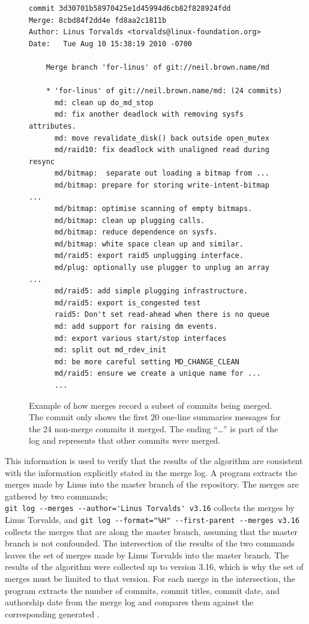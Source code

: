 \begin{figure}[htpb]
  \centering
\begin{textbox}
  \begin{verbatim}commit 3d30701b58970425e1d45994d6cb82f828924fdd
Merge: 8cbd84f2dd4e fd8aa2c1811b
Author: Linus Torvalds <torvalds@linux-foundation.org>
Date:   Tue Aug 10 15:38:19 2010 -0700

    Merge branch 'for-linus' of git://neil.brown.name/md

    * 'for-linus' of git://neil.brown.name/md: (24 commits)
      md: clean up do_md_stop
      md: fix another deadlock with removing sysfs attributes.
      md: move revalidate_disk() back outside open_mutex
      md/raid10: fix deadlock with unaligned read during resync
      md/bitmap:  separate out loading a bitmap from ...
      md/bitmap: prepare for storing write-intent-bitmap ...
      md/bitmap: optimise scanning of empty bitmaps.
      md/bitmap: clean up plugging calls.
      md/bitmap: reduce dependence on sysfs.
      md/bitmap: white space clean up and similar.
      md/raid5: export raid5 unplugging interface.
      md/plug: optionally use plugger to unplug an array ...
      md/raid5: add simple plugging infrastructure.
      md/raid5: export is_congested test
      raid5: Don't set read-ahead when there is no queue
      md: add support for raising dm events.
      md: export various start/stop interfaces
      md: split out md_rdev_init
      md: be more careful setting MD_CHANGE_CLEAN
      md/raid5: ensure we create a unique name for ...
      ...
  \end{verbatim}
\end{textbox}
  \caption{Example of how merges record a subset of commits being merged. The
                commit only shows the first 20 one-line summaries messages for the 24
                non-merge commits it merged. The ending ``\ldots'' is part of the log
                and represents that other commits were merged.}
  \label{fig:sampleMerge}
\end{figure}

This information is used to verify that the results of the \mt{}
algorithm are consistent with the information explicitly stated in the
merge log.
A program extracts the merges made by Linus into the master branch of
the repository.
The merges are gathered by two commands;\\
\verb|git log --merges --author='Linus Torvalds' v3.16| collects the
merges by Linus Torvalds, and
\verb|git log --format="%H" --first-parent --merges v3.16| collects the
merges that are along the master branch, assuming that the master branch
is not confounded.
The intersection of the results of the two commands leaves the set of
merges made by Linus Torvalds into the master branch.
The results of the algorithm were collected up to version 3.16, which is
why the set of merges must be limited to that version.
For each merge in the intersection, the program extracts the
number of commits, commit titles, commit date, and authorship date from
the merge log and compares them against the corresponding generated \mt{}.

